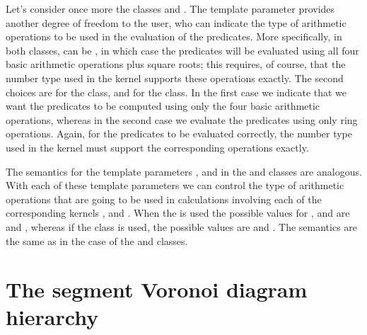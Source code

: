 Let's consider once more the classes
 and 
.
The template parameter  provides another degree of freedom
to the user, who can indicate the type of arithmetic operations to
be used in the evaluation of the predicates. More specifically, in
both classes,  can be , in
which case the predicates will be evaluated using all four basic
arithmetic operations plus square roots; this requires, of course,
that the number type used in the kernel  supports these
operations exactly. The second choices are  for
the  class, and
 for the
class. In the first case we indicate that we want the predicates to be
computed using only the four basic arithmetic operations, whereas in
the second case we evaluate the predicates using only ring operations.
Again, for the predicates to be evaluated correctly, the number type
used in the kernel  must support the corresponding operations
exactly.

The semantics for the template parameters ,  and
 in the
 and 
classes are analogous. With each of these template parameters we can
control the type of arithmetic operations that are going to be used in
calculations involving each of the corresponding kernels ,
 and . When the
 is
used the possible values for ,  and  are
 and , whereas if the 
class is used, the possible values are  and
. The semantics are the same as in the case of the 
 and 
 classes.






\section{The segment Voronoi diagram hierarchy}
\label{sec:sdg2-hierarchy}


